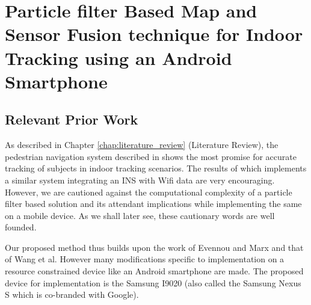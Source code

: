 \chapter[Proposed Work]{Particle filter Based Map and Sensor Fusion technique for Indoor Tracking 
using an Android Smartphone\label{chap:proposed_method}}

\section{Relevant Prior Work}
As described in Chapter \ref{chap:literature_review} (Literature Review),
the pedestrian navigation system described in \cite{Wang} 
shows the most promise for accurate tracking of subjects in indoor tracking scenarios. 
The results of \cite{Evennou} which implements a similar system integrating an INS 
with Wifi data are very encouraging. However, we are cautioned 
against the computational complexity of a particle filter based solution and its attendant
implications while implementing the same on a mobile device. As we shall later
see, these cautionary words are well founded.

Our proposed method thus builds upon the work of Evennou and Marx\cite{Evennou}
and that of Wang et al\cite{Wang}. However many modifications specific to
implementation on a resource constrained device like an Android smartphone are
made. The proposed device for implementation is the Samsung I9020 (also called
the Samsung Nexus S which is co-branded with Google).



